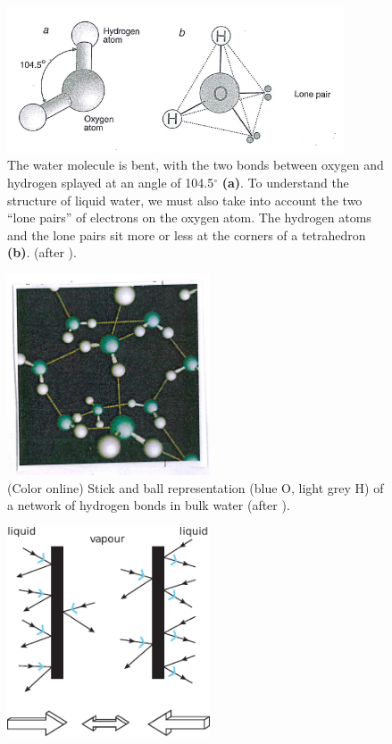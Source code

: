 \begin{subappendices}
\begin{figure}
\end{figure}
\begin{figure}
\centerline{\includegraphics[width=10cm]{C8/figsC8/fig6G6.pdf}}
\caption{The water molecule is bent, with the two bonds between oxygen and hydrogen splayed at an angle of 104.5$^\circ$ \textbf{(a)}. To understand the structure of liquid water, we must also take into account the two ``lone pairs'' of electrons on the oxygen atom. The hydrogen atoms and the lone pairs sit more or less at the corners of a tetrahedron \textbf{(b)}. (after \cite{Ball:03}).}\label{fig6G6}
\end{figure}
\begin{figure}
\centerline{\includegraphics[width=6cm]{C8/figsC8/fig6G7.pdf}}
\caption{(Color online) Stick and ball representation (blue O, light grey H) of a network of hydrogen bonds in bulk water (after \cite{Chandler:02}). }\label{fig6G7}
\end{figure}
\begin{figure}
\centerline{\includegraphics[width=6cm]{C8/figsC8/fig6G8.pdf}}

\end{figure}
\end{subappendices}
